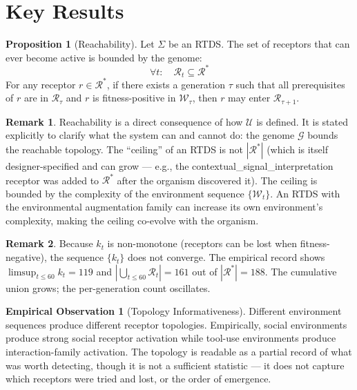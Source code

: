 \documentclass[12pt]{article}
\theoremstyle{definition}
\newtheorem{proposition}{Proposition}
\newtheorem{remark}{Remark}
\newtheorem{observation}{Empirical Observation}
\begin{document}
\section{Key Results}

\begin{proposition}[Reachability]
Let $\Sigma$ be an RTDS. The set of receptors that can ever become active is bounded by
the genome:
\[
\forall t: \quad \mathcal{R}_t \subseteq \mathcal{R}^*
\]
For any receptor $r \in \mathcal{R}^*$, if there exists a generation $\tau$ such that
all prerequisites of $r$ are in $\mathcal{R}_\tau$ and $r$ is fitness-positive in
$\mathcal{W}_\tau$, then $r$ may enter $\mathcal{R}_{\tau+1}$.
\end{proposition}

\begin{remark}
Reachability is a direct consequence of how $\mathcal{U}$ is defined. It is stated
explicitly to clarify what the system can and cannot do: the genome $\mathcal{G}$
bounds the reachable topology. The ``ceiling'' of an RTDS is not
$|\mathcal{R}^*|$ (which is itself designer-specified and can grow --- e.g., the
contextual\_signal\_interpretation receptor was added to $\mathcal{R}^*$ after the
organism discovered it). The ceiling is bounded by the complexity of the environment
sequence $\{\mathcal{W}_t\}$. An RTDS with the environmental augmentation family
can increase its own environment's complexity, making the ceiling co-evolve with
the organism.
\end{remark}

\begin{remark}
Because $k_t$ is non-monotone (receptors can be lost when fitness-negative), the
sequence $\{k_t\}$ does not converge. The empirical record shows
$\limsup_{t \leq 60} k_t = 119$ and
$|\bigcup_{t \leq 60} \mathcal{R}_t| = 161$ out of $|\mathcal{R}^*| = 188$.
The cumulative union grows; the per-generation count oscillates.
\end{remark}

\begin{observation}[Topology Informativeness]
Different environment sequences produce different receptor topologies. Empirically,
social environments produce strong social receptor activation while tool-use
environments produce interaction-family activation. The topology is readable as a
partial record of what was worth detecting, though it is not a sufficient statistic
--- it does not capture which receptors were tried and lost, or the order of emergence.
\end{observation}
\end{document}
